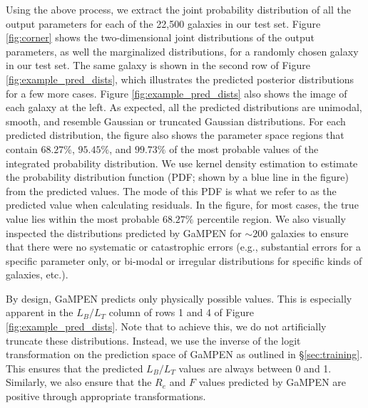\documentclass[twocolumn]{aastex63}
\newcommand\gampen{GaMPEN}
\begin{document}
\begin{CJK*}{UTF8}{gbsn}
Using the above process, we extract the joint probability distribution of all the output parameters for each of the 22,500 galaxies in our test set. Figure \ref{fig:corner} shows the two-dimensional joint distributions of the output parameters, as well the marginalized distributions, for a randomly chosen galaxy in our test set. 
The same galaxy %
is shown in the second row of Figure \ref{fig:example_pred_dists},
which illustrates the predicted posterior distributions for a few more cases.
Figure \ref{fig:example_pred_dists} also shows the image of each galaxy %
at the left.
As expected, all the predicted distributions are unimodal, smooth, and resemble Gaussian or truncated Gaussian distributions. For each predicted distribution, the figure also shows the parameter space regions that contain $68.27\%$, $95.45\%$, and $99.73\%$ of the most probable values of the integrated probability distribution. We use kernel density estimation to estimate the probability distribution function (PDF; shown by a blue line in the figure) from the predicted values. The mode of this PDF is what we refer to as the predicted value when calculating residuals. In the figure, for most cases, the true value lies within the most probable $68.27\%$ percentile region. We also visually inspected the distributions predicted by \gampen{} for $\sim200$ galaxies to ensure that there were no systematic or catastrophic errors (e.g., substantial errors for a specific parameter only, or bi-modal or irregular distributions for specific kinds of galaxies, etc.). 

By design, \gampen{} predicts only physically possible values. This is especially apparent in the $L_B/L_T$ column of rows 1 and 4 of Figure \ref{fig:example_pred_dists}. Note that to achieve this, we do not artificially truncate these distributions. Instead, we use the inverse of the logit transformation on the prediction space of \gampen{} as outlined in \S \ref{sec:training}. This ensures that the predicted $L_B/L_T$ values are always between 0 and 1. Similarly, we also ensure  that the $R_e$ and $F$ values predicted by \gampen{} are positive through appropriate transformations. 


\end{CJK*}
\end{document}

